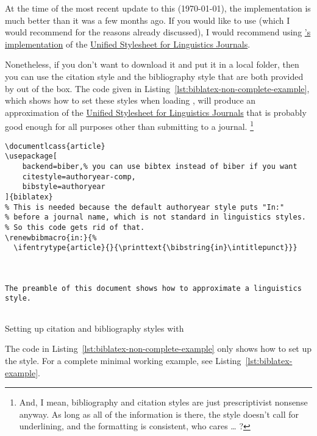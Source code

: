 At the time of the most recent update to this  (\today), the implementation is much better than it was a few months ago.
If you would like to use  (which I would recommend for the reasons already discussed), I would recommend using \href{https://github.com/semprag/biblatex-sp-unified}{'s implementation} of the \href{http://celxj.org/downloads/UnifiedStyleSheet.pdf}{Unified Stylesheet for Linguistics Journals}.

Nonetheless, if you don't want to download it and put it in a local  folder, then you can use the  citation style and the  bibliography style that are both provided by  out of the box.
The code given in Listing~\ref{lst:biblatex-non-complete-example}, which shows how to set these styles when loading , will produce an approximation of the \href{http://celxj.org/downloads/UnifiedStyleSheet.pdf}{Unified Stylesheet for Linguistics Journals} that is probably good enough for all purposes other than submitting to a journal.%
\footnote{%
And, I mean, bibliography and citation styles are just prescriptivist nonsense anyway.
As long as all of the information is there, the style doesn't call for underlining, and the formatting is consistent, who cares \ldots{} ?%
}

\begin{listing}[htbp]
	\centering
	\begin{verbatim}
\documentlcass{article}
\usepackage[
    backend=biber,% you can use bibtex instead of biber if you want
    citestyle=authoryear-comp,
    bibstyle=authoryear
]{biblatex}
% This is needed because the default authoryear style puts "In:"
% before a journal name, which is not standard in linguistics styles.
% So this code gets rid of that.
\renewbibmacro{in:}{%
  \ifentrytype{article}{}{\printtext{\bibstring{in}\intitlepunct}}}



The preamble of this document shows how to approximate a linguistics style.


	\end{verbatim}
	\caption{Setting up citation and bibliography styles with }
	\label{lst:biblatex-non-complete-example}
\end{listing}

The code in Listing~\ref{lst:biblatex-non-complete-example} only shows how to set up the style.
For a complete minimal working example, see Listing~\ref{lst:biblatex-example}.

